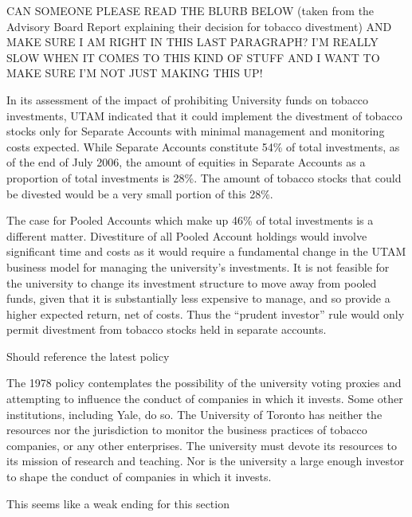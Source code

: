 \begin{vcom}
CAN SOMEONE PLEASE READ THE BLURB BELOW (taken from the Advisory Board Report explaining their decision for tobacco divestment) AND MAKE SURE I AM RIGHT IN THIS LAST PARAGRAPH? I’M REALLY SLOW WHEN IT COMES TO THIS KIND OF STUFF AND I WANT TO MAKE SURE I’M NOT JUST MAKING THIS UP!
\end{vcom}



In its assessment of the impact of prohibiting University funds on tobacco investments, UTAM indicated that it could implement the divestment of tobacco stocks only for Separate Accounts with minimal management and monitoring costs expected. 
While Separate Accounts constitute 54\% of total investments, as of the end of July 2006, the amount of equities in Separate Accounts as a proportion of total investments is 28\%. 
The amount of tobacco stocks that could be divested would be a very small portion of this 28\%.



The case for Pooled Accounts which make up 46\% of total investments is a different matter. 
Divestiture of all Pooled Account holdings would involve significant time and costs as it would require a fundamental change in the UTAM business model for managing the university's investments. 
It is not feasible for the university to change its investment structure to move away from pooled funds, given that it is substantially less expensive to manage, and so provide a higher expected return, net of costs. 
Thus the ``prudent investor'' rule would only permit divestment from tobacco stocks held in separate accounts.

\begin{vcom}
	Should reference the latest policy
\end{vcom}

The 1978 policy contemplates the possibility of the university voting proxies and attempting to influence the conduct of companies in which it invests. 
Some other institutions, including Yale, do so. 
The University of Toronto has neither the resources nor the jurisdiction to monitor the business practices of tobacco companies, or any other enterprises. 
The university must devote its resources to its mission of research and teaching. 
Nor is the university a large enough investor to shape the conduct of companies in which it invests. 

\begin{vcom}
	This seems like a weak ending for this section
\end{vcom}


